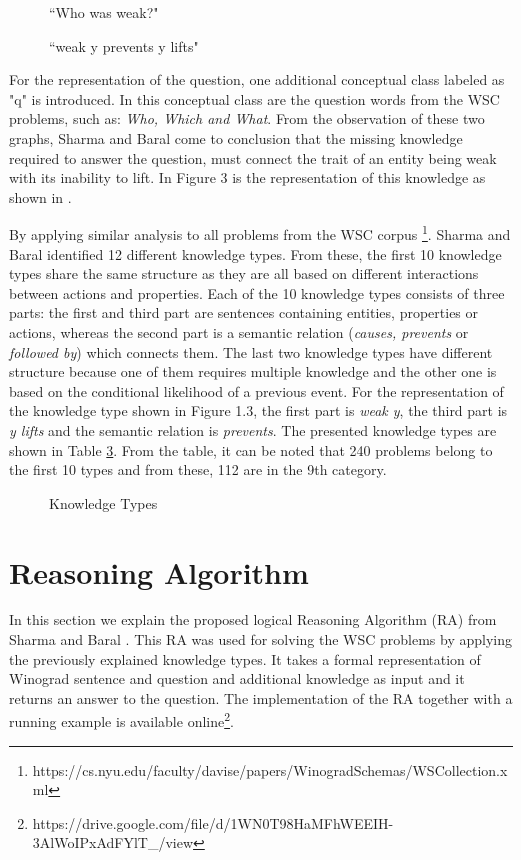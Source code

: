 \begin{figure} [h!]
	\centering
	
	\caption{\label{Graph12}``Who was weak?"}
\end{figure}

\begin{figure} [h!]
	\centering
	
	\caption{\label{Graph13} ``weak y prevents y lifts"}
\end{figure}

For the representation of the question, one additional conceptual class labeled as "q" is introduced. In this conceptual class are the question words from the WSC problems, such as: \textit{Who, Which and What}. 
From the observation of these two graphs, Sharma and Baral \cite{2018CommonsenseKT} come to conclusion that the missing knowledge required to answer the question, must connect the trait of an entity being weak with its inability to lift. In Figure 3 is the representation of this knowledge as shown in \cite{2018CommonsenseKT}. 

By applying similar analysis to all problems from the WSC corpus \footnote{https://cs.nyu.edu/faculty/davise/papers/WinogradSchemas/WSCollection.xml}. Sharma and Baral \cite{2018CommonsenseKT} identified 12 different knowledge types. From these, the first 10 knowledge types share the same structure as they are all based on different interactions between actions and properties. Each of the 10 knowledge types consists of three parts: the first and third part are sentences containing entities, properties or actions, whereas the second part is a semantic relation (\textit{causes, prevents} or \textit{followed by}) which connects them. The last two knowledge types have different structure because one of them requires multiple knowledge and the other one is based on the conditional likelihood of a previous event. 
For the representation of the knowledge type shown in Figure 1.3, the first part is \textit{weak y}, the third part is \textit{y lifts} and the semantic relation is \textit{prevents}. The presented knowledge types are shown in Table \ref{Ktypes}. From the table, it can be noted that 240 problems belong to the first 10 types and from these, 112 are in the 9th category. \\ 

\begin{figure} [h!]
	\centering
	
	\caption{\label{Ktypes} Knowledge Types}
\end{figure}
\pagebreak

\section{Reasoning Algorithm}
\label{RA}
In this section we explain the proposed logical Reasoning Algorithm (RA) from Sharma and Baral \cite{2018CommonsenseKT}. This RA was used for solving the WSC problems by applying the previously explained knowledge types. It takes a formal representation of Winograd sentence and question and additional knowledge as input and it returns an answer to the question. The implementation of the RA together with a running example is available online\footnote{https://drive.google.com/file/d/1WN0T98HaMFhWEEIH-3AlWoIPxAdFYlT\_/view}. 

